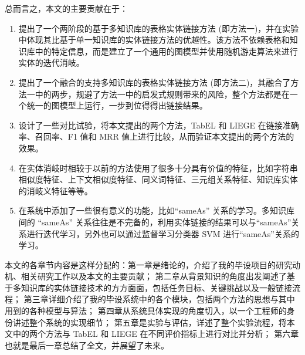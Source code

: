总而言之，本文的主要贡献在于：
\begin{enumerate}[1.]
  \item 提出了一个两阶段的基于多知识库的表格实体链接方法 (即方法一)，并在实验中体现其比基于单一知识库的实体链接方法的优越性。该方法不依赖表格和知识库中的特定信息，而是建立了一个通用的图模型并使用随机游走算法来进行实体的迭代消岐。
  \item 提出了一个融合的支持多知识库的表格实体链接方法 (即方法二)，其融合了方法一中的两步，规避了方法一中的启发式规则带来的风险，整个方法都是在一个统一的图模型上运行，一步到位得得出链接结果。
  \item 设计了一些对比试验，将本文提出的两个方法，TabEL\cite{bhagavatula2015tabel} 和 LIEGE\cite{shen2012liege} 在链接准确率、召回率、F1 值和 MRR 值上进行比较，从而验证本文提出的两个方法的效果。
  \item 在实体消岐时相较于以前的方法使用了很多十分具有价值的特征，比如字符串相似度特征、上下文相似度特征、同义词特征、三元组关系特征、知识库实体的消岐义特征等等。
  \item 在系统中添加了一些很有意义的功能，比如``sameAs'' 关系的学习。多知识库间的 ``sameAs'' 关系往往是不完备的，利用实体链接的结果可以与``sameAs''关系进行迭代学习，另外也可以通过监督学习分类器 SVM\cite{tong2001support} 进行``sameAs''关系的学习。
\end{enumerate}

本文的各章节内容是这样分配的：第一章是绪论的，介绍了我的毕设项目的研究动机、相关研究工作以及本文的主要贡献；
第二章从背景知识的角度出发阐述了基于多知识库的实体链接技术的方方面面，包括任务目标、关键挑战以及一般链接流程；
第三章详细介绍了我的毕设系统中的各个模块，包括两个方法的思想与其中用到的各种模型与算法；
第四章从系统具体实现的角度切入，以一个工程师的身份讲述整个系统的实现细节；
第五章是实验与评估，详述了整个实验流程，将本文中的两个方法与 TabEL\cite{bhagavatula2015tabel} 和 LIEGE\cite{shen2012liege} 在不同评价指标上进行对比并分析；
第六章也就是最后一章总结了全文，并展望了未来。












